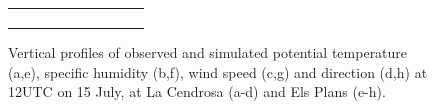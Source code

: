 \begin{figure}[hbtp]
{\begin{tabular}{@{}cccc@{}}
\begin{subfigure}[t]{0.283\textwidth}
        \end{subfigure} \\
    \end{tabular}
    }
    \caption{Vertical profiles of observed and simulated potential temperature (a,e), specific humidity (b,f), wind speed (c,g) and direction (d,h) at 12UTC on 15 July, at La Cendrosa (a-d) and Els Plans (e-h).}
    \label{fig:profiles_cendrosa_1507}
\end{figure}

\begin{figure}[hbtp]
    \centering
\end{figure}

